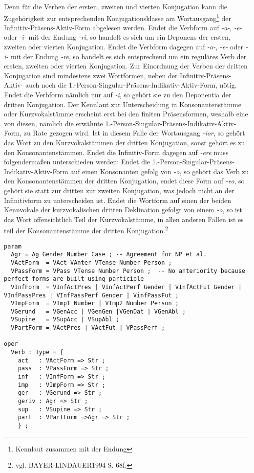 \documentclass[12pt,abstract=on]{scrreprt}
\begin{document}
Denn für die Verben der ersten, zweiten und vierten Konjugation kann die Zugehörigkeit zur entsprechenden Konjugationsklasse am Wortausgang\footnote{Kennlaut zusammen mit der Endung} der Infinitiv-Präsens-Aktiv-Form abgelesen werden. Endet die Verbform auf \textit{-a-}, \textit{-e-} oder \textit{-i-} mit der Endung \textit{-ri}, so handelt es sich um ein Deponens der ersten, zweiten oder vierten Konjugation. Endet die Verbform dagegen auf \textit{-a-}, \textit{-e-} oder \textit{-i-} mit der Endung \textit{-re}, so handelt es sich entsprechend um ein reguläres Verb der ersten, zweiten oder vierten Konjugation. Zur Einordnung der Verben der dritten Konjugation sind mindestens zwei Wortformen, neben der Infinitiv-Präsens-Aktiv- auch noch die 1.-Person-Singular-Präsens-Indikativ-Aktiv-Form, nötig. Endet die Verbform nämlich nur auf \textit{-i}, so gehört sie zu den Deponentia der dritten Konjugation. Der Kennlaut zur Unterscheidung in Konsonantenstämme oder Kurzvokalstämme erscheint erst bei den finiten Präsensformen, weshalb eine von diesen, nämlich die erwähnte 1.-Person-Singular-Präsens-Indikativ-Aktiv-Form, zu Rate gezogen wird. Ist in diesem Falle der Wortausgang \textit{-ior}, so gehört das Wort zu den Kurzvokalstämmen der dritten Konjugation, sonst gehört es zu den Konsonantenstämmen. Endet die Infinitiv-Form dagegen auf \textit{-ere} muss folgendermaßen unterschieden werden: Endet die 1.-Person-Singular-Präsens-Indikativ-Aktiv-Form auf einen Konsonanten gefolg von \textit{-o}, so gehört das Verb zu den Konsonantenstämmen der dritten Konjugation, endet diese Form auf \textit{-eo}, so gehört sie statt zur dritten zur zweiten Konjugation, was jedoch nicht an der Infinitivform zu unterscheiden ist. Endet die Wortform auf einen der beiden Kennvokale der kurzvokalischen dritten Deklination gefolgt von einem \textit{-o}, so ist das Wort offensichtlich Teil der Kurzvokalstämme, in allen anderen Fällen ist es teil der Konsonantenstämme der dritten Konjugation.\footnote{vgl. BAYER-LINDAUER1994 S. 68f.} \par
\begin{lstlisting}[float=ht,label={GF-Res-Verb},caption={Datentyp eines Verbs im Grammatical Framework}]
param
  Agr = Ag Gender Number Case ; -- Agreement for NP et al.
  VActForm  = VAct VAnter VTense Number Person ;
  VPassForm = VPass VTense Number Person ;  -- No anteriority because perfect forms are built using participle
  VInfForm  = VInfActPres | VInfActPerf Gender | VInfActFut Gender | VInfPassPres | VInfPassPerf Gender | VinfPassFut ;
  VImpForm  = VImp1 Number | VImp2 Number Person ;
  VGerund   = VGenAcc | VGenGen |VGenDat | VGenAbl ;
  VSupine   = VSupAcc | VSupAbl ;
  VPartForm = VActPres | VActFut | VPassPerf ;

oper
  Verb : Type = {
    act   : VActForm => Str ;
    pass  : VPassForm => Str ;
    inf   : VInfForm => Str ;
    imp   : VImpForm => Str ;
    ger   : VGerund => Str ;
    geriv : Agr => Str ; 
    sup   : VSupine => Str ;
    part  : VPartForm =>Agr => Str ;
    } ;
\end{lstlisting}
\end{document}
